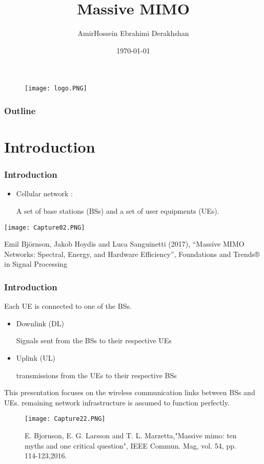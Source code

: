 \documentclass{beamer}
\title{Massive MIMO}
\author{AmirHossein Ebrahimi Derakhshan}
\institute{University of Tabriz}
\date{\today}
\begin{document}
\begin{frame}
\begin{figure}
\texttt{[image: logo.PNG]}
\end{figure}
\titlepage
\end{frame}

\begin{frame}
\frametitle{Outline}
  \tableofcontents
\end{frame}

\section{Introduction}

\begin{frame}[fragile=singleslide]\frametitle{Introduction}

\begin{itemize}
\item Cellular network :

A set of base stations (BSs) and a set of user equipments (UEs).
\end{itemize}
\begin{landscape}
\texttt{[image: Capture02.PNG]} 
\end{landscape}


\tiny Emil Björnson, Jakob Hoydis and Luca Sanguinetti (2017), “Massive MIMO Networks: Spectral, Energy, and Hardware Efficiency”, Foundations and Trends® in Signal Processing

\end{frame}







\begin{frame}[fragile=singleslide]\frametitle{Introduction}
Each UE is connected to one of the BSs.
\begin{itemize}
\item Downlink (DL)

Signals sent from the BSs to their respective UEs 
\item Uplink (UL)

transmissions from the UEs to their respective BSs
\end{itemize}
This presentation focuses on the wireless communication links between BSs and UEs. remaining network infrastructure is assumed to function perfectly.

\begin{figure}
  \texttt{[image: Capture22.PNG]}
  \caption{\tiny \tiny E. Bjornson, E. G. Larsson and T. L. Marzetta,"Massive mimo: ten myths and one critical question", IEEE Commun. Mag, vol. 54, pp. 114-123,2016.
}
\end{figure}
\end{frame}
\end{document}
